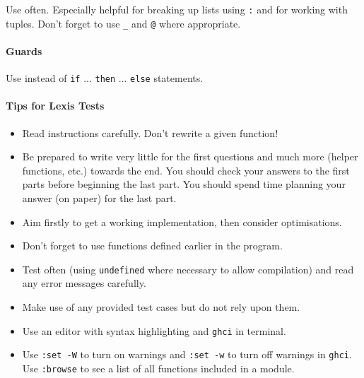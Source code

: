 \documentclass[twocolumn,english]{article}
\begin{document}
Use often. Especially helpful for breaking up lists using \texttt{:}
and for working with tuples. Don't forget to use \texttt{\_} and \texttt{@}
where appropriate.


\paragraph{Guards}

Use instead of \texttt{if} ... \texttt{then} ... \texttt{else} statements.


\paragraph*{Tips for Lexis Tests}
\begin{itemize}
\item Read instructions carefully. Don't rewrite a given function!
\item Be prepared to write very little for the first questions and much
more (helper functions, etc.) towards the end. You should check your
answers to the first parts before beginning the last part. You should
spend time planning your answer (on paper) for the last part.
\item Aim firstly to get a working implementation, then consider optimisations.
\item Don't forget to use functions defined earlier in the program.
\item Test often (using \texttt{undefined} where necessary to allow compilation)
and read any error messages carefully.
\item Make use of any provided test cases but do not rely upon them.
\item Use an editor with syntax highlighting and \texttt{ghci} in terminal.
\item Use \texttt{:set -W} to turn on warnings and \texttt{:set -w} to turn
off warnings in \texttt{ghci}. Use \texttt{:browse} to see a list of all functions included in a module.
\end{itemize}
\end{document}
